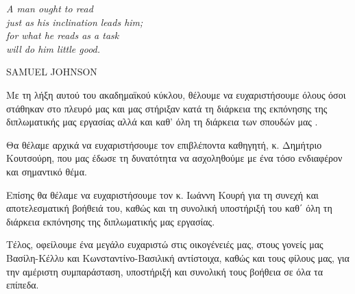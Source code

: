 \clearpage

\thispagestyle{empty}
\null\vfill

\settowidth{}
\begin{center}
	\parbox{\longest}{%
	  \raggedright{\huge\itshape%
	   A man ought to read \\ 
	  just as his inclination leads him; \\
	  for what he reads as a task \\ 
	  will do him little good.\par\bigskip
	  }   
	  \raggedleft\Large\MakeUppercase{Samuel Johnson}\par%
	}
\end{center}
\vfill\vfill

\clearpage


\begin{acknowledgementsgr}
Με τη λήξη αυτού του ακαδημαϊκού κύκλου, θέλουμε να ευχαριστήσουμε όλους όσοι στάθηκαν στο πλευρό μας και μας στήριξαν κατά τη διάρκεια της εκπόνησης της διπλωματικής μας εργασίας αλλά και καθ’ όλη τη διάρκεια των σπουδών μας .

Θα θέλαμε αρχικά να ευχαριστήσουμε τον επιβλέποντα καθηγητή, κ. Δημήτριο Κουτσούρη, που μας έδωσε τη δυνατότητα να ασχοληθούμε με ένα τόσο ενδιαφέρον και σημαντικό θέμα.

Επίσης θα θέλαμε να ευχαριστήσουμε τον κ. Ιωάννη Κουρή για τη συνεχή και αποτελεσματική βοήθειά του, καθώς και τη συνολική υποστήριξή του καθ΄ όλη τη διάρκεια εκπόνησης της διπλωματικής μας εργασίας.

Τέλος, οφείλουμε ένα μεγάλο ευχαριστώ στις οικογένειές μας, στους γονείς μας Βασίλη-Κέλλυ και Κωνσταντίνο-Βασιλική αντίστοιχα, καθώς και τους φίλους μας, για την αμέριστη συμπαράσταση, υποστήριξή και συνολική τους βοήθεια σε όλα τα επίπεδα.
\end{acknowledgementsgr}

